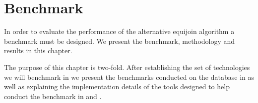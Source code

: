 \chapter{Benchmark}
In order to evaluate the performance of the alternative equijoin algorithm a
benchmark must be designed. We present the benchmark, methodology and results in
this chapter.

The purpose of this chapter is two-fold. After establishing the set of
technologies we will benchmark in  we present the benchmarks
conducted on the database in  as well as explaining the implementation details of the tools
designed to help conduct the benchmark in  and
.








